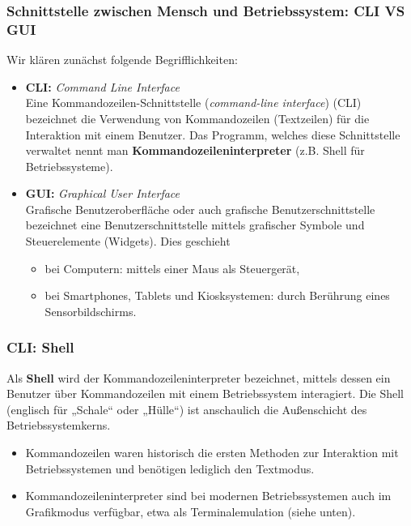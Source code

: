 \subsubsection{Schnittstelle zwischen Mensch und Betriebssystem: CLI VS GUI}
Wir klären zunächst folgende Begrifflichkeiten:
\begin{itemize}
	\item \textbf{CLI:} \textit{Command Line Interface} \\
Eine Kommandozeilen-Schnittstelle (\textit{command-line interface}) (CLI)  bezeichnet die Verwendung von Kommandozeilen (Textzeilen) für die Interaktion mit einem Benutzer. Das Programm, welches diese Schnittstelle verwaltet nennt man \textbf{Kommandozeileninterpreter} (z.B. Shell für Betriebssysteme).
%
\item \textbf{GUI:} \textit{Graphical User Interface}\\
Grafische Benutzeroberfläche oder auch grafische Benutzerschnittstelle bezeichnet eine Benutzerschnittstelle mittels grafischer Symbole und Steuerelemente (Widgets). Dies geschieht
\begin{itemize}
	\item bei Computern: mittels einer Maus als Steuergerät,
	\item bei Smartphones, Tablets und Kiosksystemen:  durch Berührung eines Sensorbildschirms.
\end{itemize}
\end{itemize}

\subsubsection*{CLI: Shell}
Als \textbf{Shell} wird der Kommandozeileninterpreter bezeichnet, mittels dessen ein Benutzer über Kommandozeilen mit einem Betriebssystem interagiert. Die Shell (englisch für „Schale“ oder „Hülle“) ist anschaulich die Außenschicht des Betriebssystemkerns.
\begin{itemize}
	\item Kommandozeilen waren historisch die ersten Methoden zur Interaktion mit Betriebssystemen und benötigen lediglich den Textmodus.
	\item Kommandozeileninterpreter sind bei modernen Betriebssystemen auch im Grafikmodus verfügbar, etwa als Terminalemulation (siehe unten).
\end{itemize}

